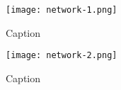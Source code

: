 \documentclass[../mthe-493-final-project.tex]{subfiles}
\begin{document}
    \section{}

    \begin{figure}
        \centering
        \texttt{[image: network-1.png]}
        \caption{Caption}
        \label{fig:network-flowchart}
    \end{figure}

    \begin{figure}
        \centering
        \texttt{[image: network-2.png]}
        \caption{Caption}
        \label{fig:network-sequence}
    \end{figure}

\end{document}
